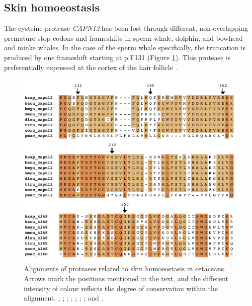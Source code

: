 \subsection{Skin homoeostasis} \label{ss_sperm_whale_results_skin}

The cysteine-protease \textit{CAPN12} has been lost through different, non-overlapping premature stop codons and frameshifts in sperm whale, dolphin, and bowhead and minke whales.
In the case of the sperm whale specifically, the truncation is produced by one frameshift starting at {p.F131} (Figure \ref{f_results_sperm_whale_alignments_skin}).
This protease is preferentially expressed at the cortex of the hair follicle \cite{Dear2000}.

\begin{figure}[t!]
    \begin{center}
        \includegraphics[width=\textwidth]{figures/alignment_skin.pdf}
        \caption[Alignments of proteases related to skin homoeostasis in cetaceans]{\footnotesize Alignments of proteases related to skin homoeostasis in cetaceans. Arrows mark the positions mentioned in the text, and the different intensity of colour reflects the degree of conservation within the alignment. \hsap; \bacu; \bmys; \mmon; \dleu; \ttru; \oorc; and \pmac.}
        \label{f_results_sperm_whale_alignments_skin}
    \end{center}
\end{figure}

